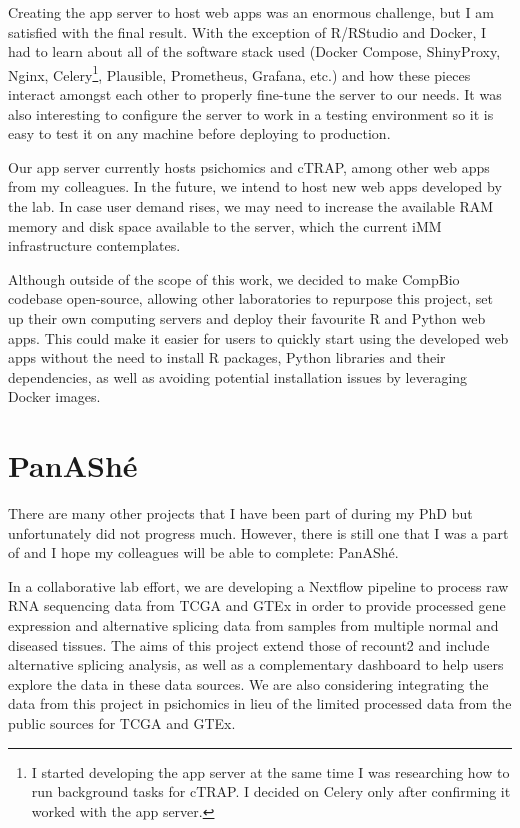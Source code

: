 Creating the app server to host web apps was an enormous challenge, but I am satisfied with the final result. With the exception of R/RStudio and Docker, I had to learn about all of the software stack used (Docker Compose, ShinyProxy, Nginx, Celery\footnote{I started developing the app server at the same time I was researching how to run background tasks for cTRAP. I decided on Celery only after confirming it worked with the app server.}, Plausible, Prometheus, Grafana, etc.) and how these pieces interact amongst each other to properly fine-tune the server to our needs. It was also interesting to configure the server to work in a testing environment so it is easy to test it on any machine before deploying to production.

Our app server currently hosts psichomics and cTRAP, among other web apps from my colleagues. In the future, we intend to host new web apps developed by the lab. In case user demand rises, we may need to increase the available RAM memory and disk space available to the server, which the current iMM infrastructure contemplates.

Although outside of the scope of this work, we decided to make CompBio codebase open-source, allowing other laboratories to repurpose this project, set up their own computing servers and deploy their favourite R and Python web apps. This could make it easier for users to quickly start using the developed web apps without the need to install R packages, Python libraries and their dependencies, as well as avoiding potential installation issues by leveraging Docker images.

\section{PanAShé}

There are many other projects that I have been part of during my PhD but unfortunately did not progress much. However, there is still one that I was a part of and I hope my colleagues will be able to complete: PanAShé.

In a collaborative lab effort, we are developing a Nextflow pipeline to process raw RNA sequencing data from TCGA \cite{chang:2013ww} and GTEx \cite{lonsdale:2013uo} in order to provide processed gene expression and alternative splicing data from samples from multiple normal and diseased tissues. The aims of this project extend those of recount2 \cite{collado-torres:2017uw} and include alternative splicing analysis, as well as a complementary dashboard to help users explore the data in these data sources. We are also considering integrating the data from this project in psichomics in lieu of the limited processed data from the public sources for TCGA and GTEx.

